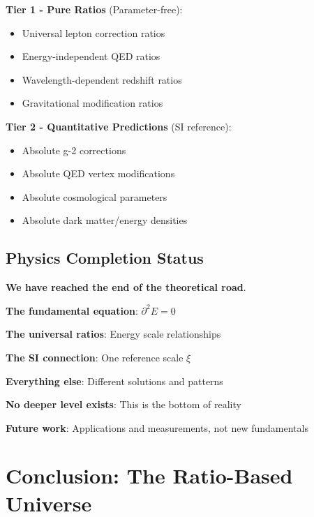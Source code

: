 \documentclass[12pt,a4paper]{article}
\newcommand{\Efield}{E}
\newcommand{\xipar}{\xi}
\theoremstyle{definition}
\theoremstyle{remark}
\begin{document}
										\textbf{Tier 1 - Pure Ratios} (Parameter-free):
										\begin{itemize}
											\item Universal lepton correction ratios
											\item Energy-independent QED ratios
											\item Wavelength-dependent redshift ratios
											\item Gravitational modification ratios
										\end{itemize}
										
										\textbf{Tier 2 - Quantitative Predictions} (SI reference):
										\begin{itemize}
											\item Absolute g-2 corrections
											\item Absolute QED vertex modifications
											\item Absolute cosmological parameters
											\item Absolute dark matter/energy densities
										\end{itemize}
										
										\subsection{Physics Completion Status}
										
							\begin{tcolorbox}[colback=yellow!5!white,colframe=orange!75!black,title=The End of Fundamental Physics]
								\textbf{We have reached the end of the theoretical road}.
								
								\textbf{The fundamental equation}: $\partial^2 \Efield = 0$
								
								\textbf{The universal ratios}: Energy scale relationships
								
								\textbf{The SI connection}: One reference scale $\xipar$
								
								\textbf{Everything else}: Different solutions and patterns
								
								\textbf{No deeper level exists}: This is the bottom of reality
								
								\textbf{Future work}: Applications and measurements, not new fundamentals
							\end{tcolorbox}
															
															\section{Conclusion: The Ratio-Based Universe}
															
\end{document}
